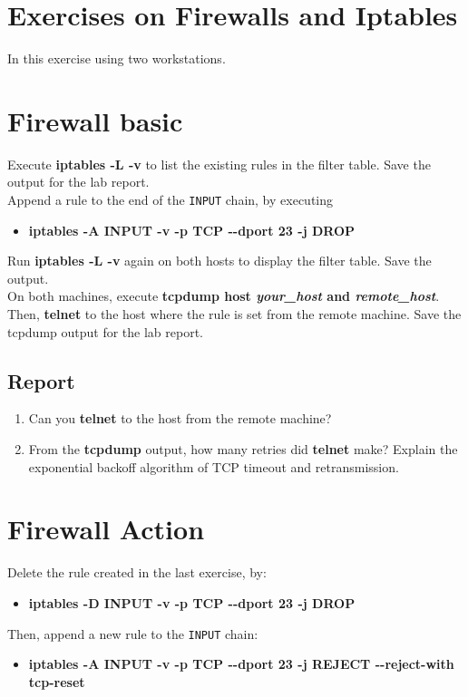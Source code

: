 \documentclass[10pt,a4paper]{article}
\numberwithin{equation}{section}
\numberwithin{figure}{section}
\numberwithin{table}{section}
\begin{document}
\section*{Exercises on Firewalls and Iptables}
	In this exercise using two workstations.

\section{Firewall basic}
	Execute \textbf{iptables -L -v} to list the existing rules in the filter table. Save the output for the lab report.\\
	Append a rule to the end of the \texttt{INPUT} chain, by executing
	\begin{itemize}
		\setlength{\itemindent}{10pt}
		\item \textbf{iptables -A INPUT -v -p TCP -{}-dport 23 -j DROP} 
	\end{itemize}
	
	\setlength{\parindent}{0pt}
	Run \textbf{iptables -L -v} again on both hosts to display the filter table. Save the output.\\
	On both machines, execute \textbf{tcpdump host \textit{your\_host} and \textit{remote\_host}}. Then, \textbf{telnet} to the host where the rule is set from the remote machine. Save the tcpdump output for the lab report.

	\subsection*{Report}
	\begin{enumerate}
		\item Can you \textbf{telnet} to the host from the remote machine?
		\item From the \textbf{tcpdump} output, how many retries did \textbf{telnet} make? Explain the exponential backoff algorithm of TCP timeout and retransmission.
	\end{enumerate}
	
\section{Firewall Action}
	Delete the rule created in the last exercise, by:	
	\begin{itemize}
		\item \textbf{iptables -D INPUT -v -p TCP -{}-dport 23 -j DROP}
	\end{itemize}
	
	Then, append a new rule to the \texttt{INPUT} chain:	
	\begin{itemize}
		\item \textbf{iptables -A INPUT -v -p TCP -{}-dport 23 -j REJECT -{}-reject-with tcp-reset} 
	\end{itemize}
	
\end{document}
